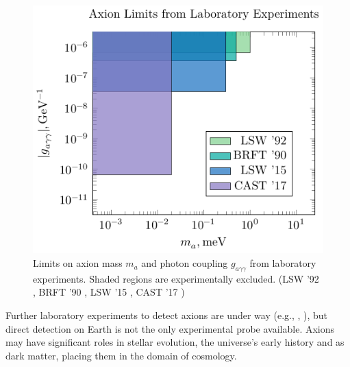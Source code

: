 \begin{figure}
	\centering
	\includegraphics{diagrams/lab-bounds.pdf}
	\caption{Limits on axion mass $m_a$ and photon coupling {}$g_{aγγ}$ from laboratory experiments. Shaded regions are experimentally excluded.
		(LSW '92 \cite{first-LSW-experiment},
		BRFT '90 \cite{axion_dichromism},
		LSW '15 \cite{best-LSW-experiment},
		CAST '17 \cite{CAST-helioscope_2017})
	}
	\label{fig:lab-bounds}
\end{figure}

Further laboratory experiments to detect axions are under way (e.g., \cite{further-lab-experiments_2017}, \cite[§\,5.3]{Irastorza_2018}), but direct detection on Earth is not the only experimental probe available.
Axions may have significant roles in stellar evolution, the universe's early history and as dark matter, placing them in the domain of cosmology.